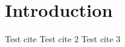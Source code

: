 \chapter*[Introduction]{Introduction}

Test cite \cite{MacLeodArticle}
Test cite 2\cite{YINArticle}
Test cite 3\cite{OpAmps}

